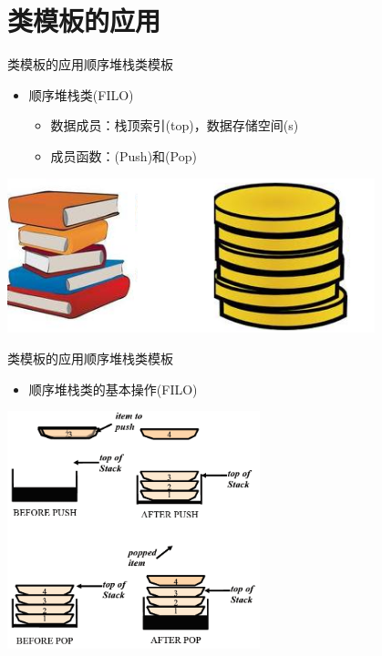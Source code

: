 \section[应用]{类模板的应用}\label{sec:chap07-sec02}
\begin{frame}[t, fragile]{类模板的应用}{顺序堆栈类模板}%
  \begin{spacing}{1.8}
  \begin{itemize}
  \item 顺序堆栈类(FILO)
    \begin{itemize}
    \item 数据成员：栈顶索引(top)，数据存储空间(s)
    \item 成员函数：(Push)和(Pop)
    \end{itemize}
  \end{itemize}
  \begin{center}
    \includegraphics[width=0.8\textwidth]{figure/chap07/01stack01}
  \end{center}
  \end{spacing}
\end{frame}

\begin{frame}[t, fragile]{类模板的应用}{顺序堆栈类模板}%
  \begin{itemize}
  \item 顺序堆栈类的基本操作(FILO)    
  \end{itemize}
  \begin{center}
    \includegraphics[width=0.55\textwidth]{figure/chap07/01stack02}
  \end{center}  
\end{frame}

